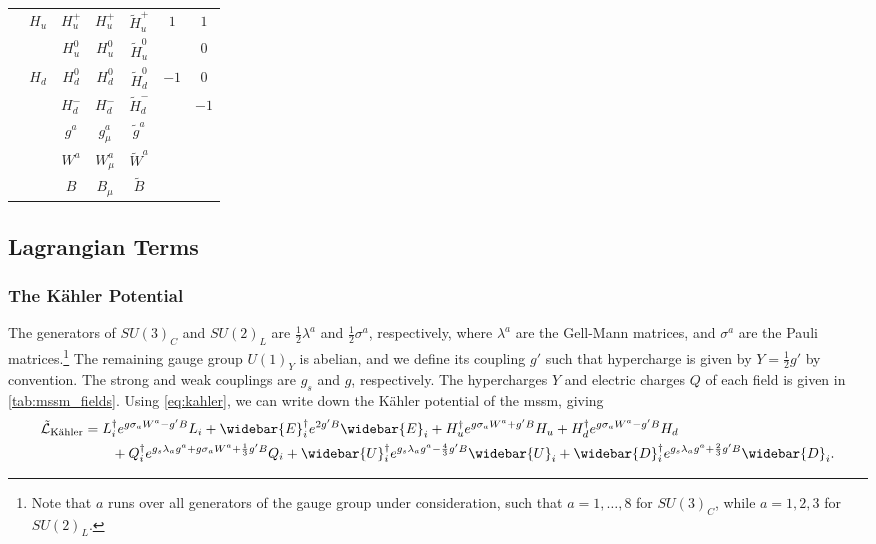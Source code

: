 \begin{table}[t]
\begin{NiceTabular}{|c|c|c|c|c|c|c|}
         &  & $H_u^+$ & $H_u^+$ & $\tilde{H}_u^+$ &  & $1$ \\
        & & $H_u^0$ & $H_u^0$ & $\tilde{H}_u^0$ & & $0$ \\ 
        &  & $H_d^0$ & $H_d^0$ & $\tilde{H}_d^0$ &  & $0$ \\
        & & $H_d^-$ & $H_d^-$ & $\tilde{H}_d^-$ & & $-1$ \\ \hline
         & & $g^a$ & $g^a_\mu$ & $\tilde{g}^a$ \\ 
        & & $W^a$ & $W^a_\mu$ & $\tilde{W}^a$ \\ 
        & & $B$ & $B_\mu$ & $\tilde{B}$ \\ \hline
    \end{NiceTabular}
\end{table}


\subsection{Lagrangian Terms}

\subsubsection{The K\"ahler Potential}

The generators of $SU(3)_C$ and $SU(2)_L$ are $\frac{1}{2}\lambda^a$ and $\frac{1}{2}\sigma^a$, respectively, where $\lambda^a$ are the Gell-Mann matrices, and $\sigma^a$ are the Pauli matrices.\footnote{Note that $a$ runs over all generators of the gauge group under consideration, such that $a=1,\ldots,8$ for $SU(3)_C$, while $a=1,2,3$ for $SU(2)_L$.}
The remaining gauge group $U(1)_Y$ is abelian, and we define its coupling $g'$ such that hypercharge is given by $Y=\frac{1}{2}g'$ by convention. The strong and weak couplings are $g_s$ and $g$, respectively. The hypercharges $Y$ and electric charges $Q$ of each field is given in \cref{tab:mssm_fields}.
Using \cref{eq:kahler}, we can write down the K\"ahler potential of the \gls{mssm}, giving
\begin{equation}
\label{eq:mssm_kahler}
\begin{split}
    \tilde{\mathcal{L}}_{\text{K\"ahler}} &=
    L_i^\dagger e^{g\sigma_a W^a - g'B}L_i
    + \widebar{E}_i^\dagger e^{2g'B} \widebar{E}_i
    + H_u^\dagger e^{g\sigma_a W^a + g'B} H_u
    + H_d^\dagger e^{g\sigma_a W^a - g'B} H_d
    \\ &\qquad
    + Q_i^\dagger e^{g_s\lambda_a g^a + g\sigma_a W^a + \frac{1}{3}g'B} Q_i
    + \widebar{U}_i^\dagger e^{g_s \lambda_a g^a - \frac{4}{3}g'B} \widebar{U}_i
    + \widebar{D}_i^\dagger e^{g_s \lambda_a g^a + \frac{2}{3}g'B} \widebar{D}_i.
\end{split}
\end{equation}


